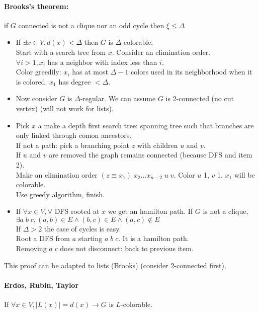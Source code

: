 \documentclass[12pt]{article}
\begin{document}
\paragraph{Brooks's theorem:} if $G$ connected is not a clique nor an odd cycle then $\xi \leqslant \Delta$\\
\begin{itemize}
\item If $\exists x \in V, d(x) < \Delta$ then $G$ is $\Delta$-colorable.\\
	Start with a search tree from $x$. Consider an elimination order.\\
	$\forall i > 1, x_i$ has a neighbor with index less than $i$.\\
	Color greedily: $x_i$ has at most $\Delta-1$ colors used in its neighborhood when it is colored. $x_1$ has degree $< \Delta$.\\
\item Now consider $G$ is $\Delta$-regular. We can assume $G$ is 2-connected (no cut vertex) (will not work for lists).\\
\item Pick $x$ a make a depth first search tree: spanning tree such that branches are only linked through comon ancestors.\\
	If not a path: pick a branching point $z$ with children $u$ and $v$.\\
	If $u$ and $v$ are removed the graph remains connected (because DFS and item 2).\\
	Make an elimination order $(z \equiv x_1) \; x_2 ... x_{n-2}  \; u \; v$. Color $u$ 1, $v$ 1. $x_1$ will be colorable.\\
	Use greedy algorithm, finish.
\item If $\forall x \in V, \forall$ DFS rooted at $x$ we get an hamilton path.
	If $G$ is not a clique, $\exists a \; b \; c, (a,b) \in E \wedge (b,c) \in E \wedge (a,c) \notin E$\\
	If $\Delta > 2$ the case of cycles is easy.\\
	Root a DFS from $a$ starting $a \; b \; c$. It is a hamilton path.\\
	Removing $a \; c$ does not disconnect: back to previous item.
\end{itemize}
This proof can be adapted to lists (Brooks) (consider 2-connected first).

\paragraph{Erdos, Rubin, Taylor\\}
If $\forall x \in V, |L(x)| = d(x) \rightarrow G$ is $L$-colorable.
\end{document}
